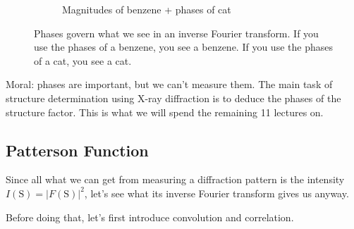 \documentclass{article}
\theoremstyle{plain}\theoremheaderfont{\normalfont\itshape}\theorembodyfont{\rmfamily}\theoremseparator{.}\newtheorem*{rem}{Remark}\newtheorem*{ex}{Example}\newtheorem*{proof}{Proof}\newtheorem*{altp}{Alternative proof}
\theoremstyle{plain}\theoremheaderfont{\normalfont\bfseries}\theorembodyfont{\rmfamily}\theoremseparator{.}\newtheorem{thm}{Theorem}[section]\newtheorem{lem}[thm]{Lemma}\newtheorem{prop}[thm]{Proposition}\newtheorem*{cor}{Corollary}\newtheorem{defn}[thm]{Definition}\newtheorem{clm}[thm]{Claim}\newtheorem{clminproof}{Claim}\newtheorem*{law}{Law}\newtheorem{pos}[thm]{Postulate}
\theoremstyle{break}\theoremheaderfont{\normalfont\itshape}\theorembodyfont{\rmfamily}\theoremseparator{.\medskip}\newtheorem*{proofskip}{Proof}\newtheorem*{exs}{Examples}\newtheorem*{rems}{Remarks}
\theoremstyle{break}\theoremheaderfont{\normalfont\bfseries}\theorembodyfont{\rmfamily}\theoremseparator{.\medskip}\newtheorem{lemskip}[thm]{Lemma}\newtheorem{defnskip}[thm]{Definition}\newtheorem{propskip}[thm]{Proposition}\newtheorem{thmskip}[thm]{Theorem}
\numberwithin{equation}{section}
\newcommand{\vb}[1]{\bm{\mathrm{#1}}}
\newcommand{\abs}[1]{\left| #1 \right|}
\begin{document}
\begin{figure}[ht!]
\begin{subfigure}[h]{0.45\linewidth}
            \caption{Magnitudes of benzene + phases of cat}
        \end{subfigure}
        \caption{Phases govern what we see in an inverse Fourier transform. If you use the phases of a benzene, you see a benzene. If you use the phases of a cat, you see a cat.}
        \label{Fig:cat_and_benzene}
    \end{figure}

    Moral: phases are important, but we can't measure them. The main task of structure determination using X-ray diffraction is to deduce the phases of the structure factor. This is what we will spend the remaining 11 lectures on.

    \subsection{Patterson Function}
    Since all what we can get from measuring a diffraction pattern is the intensity \(I(\vb{S})=\abs{F(\vb{S})}^2\), let's see what its inverse Fourier transform gives us anyway.

    Before doing that, let's first introduce convolution and correlation.
\end{document}
